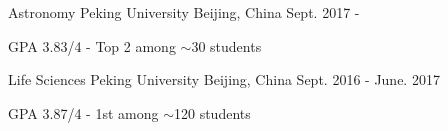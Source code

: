 


\begin{cventries}


\cventry
{Astronomy} %
{Peking University} %
{Beijing, China} %
{Sept. 2017 - } %
{ %
	\begin{cvitems}
		\item {GPA 3.83/4 - Top 2 among $\sim$30 students}
	\end{cvitems}
}

\cventry
{Life Sciences} %
{Peking University} %
{Beijing, China} %
{Sept. 2016 - June. 2017} %
{ %
	\begin{cvitems}
		\item {GPA 3.87/4 - 1st among $\sim$120 students}
	\end{cvitems}
}


\end{cventries}
